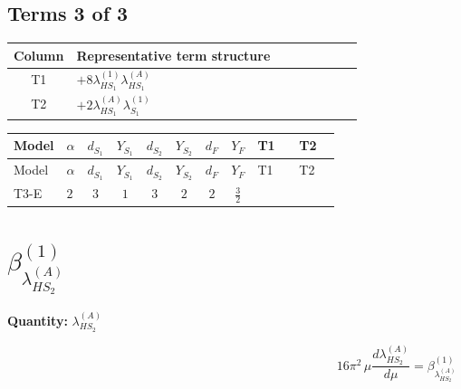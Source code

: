 \documentclass[8pt]{article}
\begin{document}
\begin{landscape}
\subsection*{Terms 3 of 3}
\begin{center}
\begin{tabular}{@{}c >{\raggedright\arraybackslash}p{0.82\linewidth}@{}}
\toprule
Column & Representative term structure \\
\midrule
T1 & \(\displaystyle +8 {\lambda_{HS_1}^{(1)}} {\lambda_{HS_1}^{(A)}}\) \\
\midrule
T2 & \(\displaystyle +2 {\lambda_{HS_1}^{(A)}} {\lambda_{S_1}^{(1)}}\) \\
\midrule
\bottomrule
\end{tabular}
\end{center}
\smallskip
\tiny
\begin{longtable}{@{}llcccccc >{\raggedright\arraybackslash}p{0.21\linewidth} >{\raggedright\arraybackslash}p{0.21\linewidth}@{}}
\toprule
Model & $\alpha$ & $d_{S_1}$ & $Y_{S_1}$ & $d_{S_2}$ & $Y_{S_2}$ & $d_F$ & $Y_F$ & T1 & T2 \\
\midrule
\endfirsthead
\toprule
Model & $\alpha$ & $d_{S_1}$ & $Y_{S_1}$ & $d_{S_2}$ & $Y_{S_2}$ & $d_F$ & $Y_F$ & T1 & T2 \\
\midrule
\endhead
T3-E & $2$ & $3$ & $1$ & $3$ & $2$ & $2$ & $\frac{3}{2}$ & \scriptsize\adjustbox{max width=\linewidth}{$\begin{gathered} +8 {\lambda_{HS_1}^{(1)}} {\lambda_{HS_1}^{(A)}}\end{gathered}$} & \scriptsize\adjustbox{max width=\linewidth}{$\begin{gathered} +2 {\lambda_{HS_1}^{(A)}} {\lambda_{S_1}^{(1)}}\end{gathered}$} \\
\midrule
\bottomrule
\end{longtable}
\clearpage
\section*{$\beta_{\lambda_{HS_2}^{(A)}}^{(1)}$}
\noindent\textbf{Quantity: }$\lambda_{HS_2}^{(A)}$\par\smallskip
\[16\pi^2\,\mu\frac{d \lambda_{HS_2}^{(A)}}{d\mu}=\beta_{\lambda_{HS_2}^{(A)}}^{(1)}\]

\end{landscape}
\end{document}
